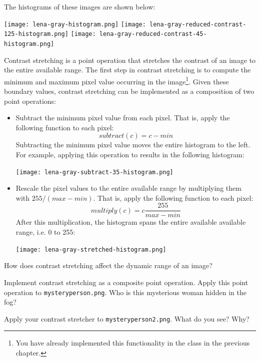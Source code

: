 \documentclass{book}
\begin{document}
The histograms of these images are shown below:
\begin{center}
\texttt{[image: lena-gray-histogram.png]}
\texttt{[image: lena-gray-reduced-contrast-125-histogram.png]}
\texttt{[image: lena-gray-reduced-contrast-45-histogram.png]}
\end{center}

Contrast stretching is a point operation that stretches the contrast of an image to the entire available range. The first step in contrast stretching is to compute the minimum and maximum pixel value occurring in the image\footnote{You have already implemented this functionality in the class  in the previous chapter.}. Given these boundary values, contrast stretching can be implemented as a composition of two point operations:
\begin{itemize}
  \item Subtract the minimum pixel value from each pixel. That is, apply the following function to each pixel:
$$subtract(c) = c - {min}$$
Subtracting the minimum pixel value moves the entire histogram to the left. For example, applying this operation to  results in the following histogram:
\begin{center}
\texttt{[image: lena-gray-subtract-35-histogram.png]}
\end{center}
  \item Rescale the pixel values to the entire available range by multiplying them with $255 / (max - min)$. That is, apply the following function to each pixel:
$$multiply(c) = c \frac{255}{max - min}$$
After this multiplication, the histogram spans the entire available available range, i.e. 0 to 255:
\begin{center}
\texttt{[image: lena-gray-stretched-histogram.png]}
\end{center}
\end{itemize}

\begin{exercise}
How does contrast stretching affect the dynamic range of an image?
\end{exercise}

\begin{exercise}
Implement contrast stretching as a composite point operation. Apply this point operation to \texttt{mysteryperson.png}. Who is this mysterious woman hidden in the fog?
\end{exercise}

\begin{exercise}
Apply your contrast stretcher to \texttt{mysteryperson2.png}. What do you see? Why?
\end{exercise}
\end{document}
